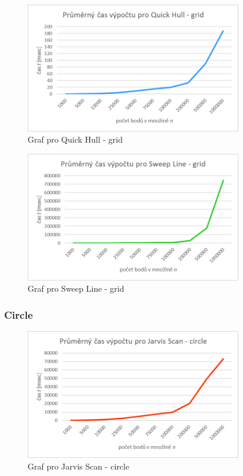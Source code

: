 \documentclass[a4paper, 12pt]{article}
\begin{document}
\begin{figure}[h!]
	\centering
	\includegraphics[width=9.5cm]{./pictures/g_grid_qh.png}
	\caption{Graf pro Quick Hull - grid}
\end{figure}

\begin{figure}[h!]
	\centering
	\includegraphics[width=9.5cm]{./pictures/g_grid_sl.png}
	\caption{Graf pro Sweep Line - grid}
\end{figure}
\clearpage

\subsubsection{Circle}
\begin{figure}[h!]
	\centering
	\includegraphics[width=9.5cm]{./pictures/g_circ_js.png}
	\caption{Graf pro Jarvis Scan - circle}
\end{figure}
\end{document}
